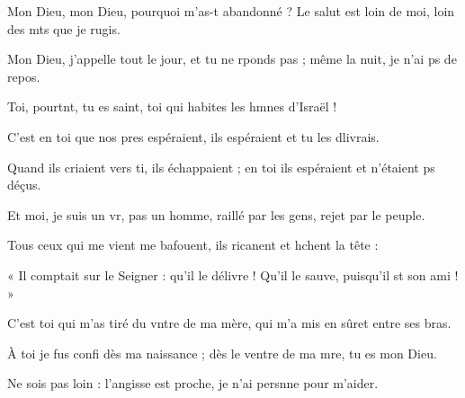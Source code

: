 \item Mon Dieu, mon Dieu, pourquoi m’as-t abandonné ?\psstar{} Le salut est loin de moi, loin des mts que je rugis.
\item Mon Dieu, j’appelle tout le jour, et tu ne rponds pas ;\psstar{} même la nuit, je n’ai ps de repos.
\item Toi, pourtnt, tu es saint,\psstar{} toi qui habites les hmnes d’Israël !
\item C’est en toi que nos pres espéraient,\psstar{} ils espéraient et tu les dlivrais.
\item Quand ils criaient vers ti, ils échappaient ;\psstar{} en toi ils espéraient et n’étaient ps déçus.
\item Et moi, je suis un vr, pas un homme,\psstar{} raillé par les gens, rejet par le peuple.
\item Tous ceux qui me vient me bafouent,\psstar{} ils ricanent et hchent la tête :
\item « Il comptait sur le Seigner : qu’il le délivre !\psstar{} Qu’il le sauve, puisqu’il st son ami ! »
\item C’est toi qui m’as tiré du vntre de ma mère,\psstar{} qui m’a mis en sûret entre ses bras.
\item À toi je fus confi dès ma naissance ;\psstar{} dès le ventre de ma mre, tu es mon Dieu.
\item Ne sois pas loin : l’angisse est proche,\psstar{} je n’ai persnne pour m’aider.